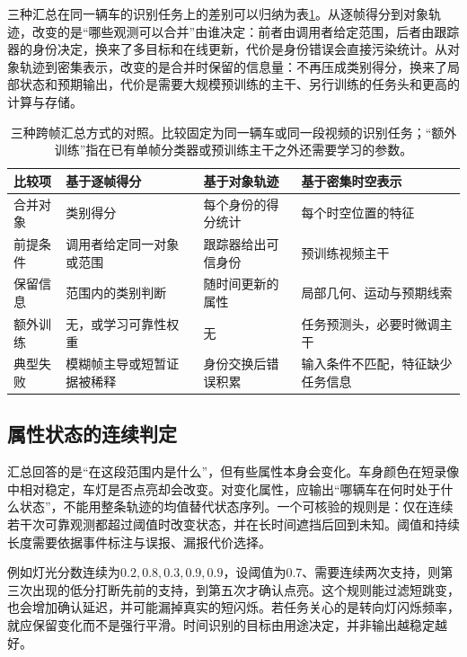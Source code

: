 三种汇总在同一辆车的识别任务上的差别可以归纳为表\ref{tab:vision-video-aggregation-compare}。从逐帧得分到对象轨迹，改变的是“哪些观测可以合并”由谁决定：前者由调用者给定范围，后者由跟踪器的身份决定，换来了多目标和在线更新，代价是身份错误会直接污染统计。从对象轨迹到密集表示，改变的是合并时保留的信息量：不再压成类别得分，换来了局部状态和预期输出，代价是需要大规模预训练的主干、另行训练的任务头和更高的计算与存储。

\begin{table}[htbp]
  \centering
  \small
  \begin{tabularx}{\linewidth}{@{}lXXX@{}}
    \toprule
    比较项 & 基于逐帧得分 & 基于对象轨迹 & 基于密集时空表示\\
    \midrule
    合并对象 & 类别得分 & 每个身份的得分统计 & 每个时空位置的特征\\
    前提条件 & 调用者给定同一对象或范围 & 跟踪器给出可信身份 & 预训练视频主干\\
    保留信息 & 范围内的类别判断 & 随时间更新的属性 & 局部几何、运动与预期线索\\
    额外训练 & 无，或学习可靠性权重 & 无 & 任务预测头，必要时微调主干\\
    典型失败 & 模糊帧主导或短暂证据被稀释 & 身份交换后错误积累 & 输入条件不匹配，特征缺少任务信息\\
    \bottomrule
  \end{tabularx}
  \caption{三种跨帧汇总方式的对照。比较固定为同一辆车或同一段视频的识别任务；“额外训练”指在已有单帧分类器或预训练主干之外还需要学习的参数。}
  \label{tab:vision-video-aggregation-compare}
\end{table}

\subsection{属性状态的连续判定}
\label{sec:vision-video-continuous-attributes}

汇总回答的是“在这段范围内是什么”，但有些属性本身会变化。车身颜色在短录像中相对稳定，车灯是否点亮却会改变。对变化属性，应输出“哪辆车在何时处于什么状态”，不能用整条轨迹的均值替代状态序列。一个可核验的规则是：仅在连续若干次可靠观测都超过阈值时改变状态，并在长时间遮挡后回到未知。阈值和持续长度需要依据事件标注与误报、漏报代价选择。

例如灯光分数连续为$0.2,0.8,0.3,0.9,0.9$，设阈值为0.7、需要连续两次支持，则第三次出现的低分打断先前的支持，到第五次才确认点亮。这个规则能过滤短跳变，也会增加确认延迟，并可能漏掉真实的短闪烁。若任务关心的是转向灯闪烁频率，就应保留变化而不是强行平滑。时间识别的目标由用途决定，并非输出越稳定越好。

